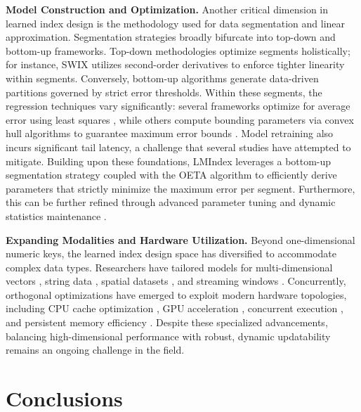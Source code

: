 \textbf{Model Construction and Optimization.}
Another critical dimension in learned index design is the methodology used for data segmentation and linear approximation. Segmentation strategies broadly bifurcate into top-down \cite{case18, alex20, swix24, carmi22} and bottom-up \cite{fiting-tree19, pgm20, bourbon20} frameworks. Top-down methodologies optimize segments holistically; for instance, SWIX \cite{swix24} utilizes second-order derivatives to enforce tighter linearity within segments. Conversely, bottom-up algorithms generate data-driven partitions governed by strict error thresholds. Within these segments, the regression techniques vary significantly: several frameworks optimize for average error using least squares \cite{alex20, sindex20, finedex21, swix24}, while others compute bounding parameters via convex hull algorithms to guarantee maximum error bounds \cite{pgm20, madex20, towards21}. Model retraining also incurs significant tail latency, a challenge that several studies \cite{chameleon24, vega25, hire25} have attempted to mitigate. Building upon these foundations, LMIndex leverages a bottom-up segmentation strategy coupled with the OETA algorithm to efficiently derive parameters that strictly minimize the maximum error per segment. Furthermore, this can be further refined through advanced parameter tuning \cite{tuning22, airindex23, newtuning25} and dynamic statistics maintenance \cite{sali23}.

\textbf{Expanding Modalities and Hardware Utilization.}
Beyond one-dimensional numeric keys, the learned index design space has diversified to accommodate complex data types. Researchers have tailored models for multi-dimensional vectors \cite{flood20, Tsunami20, coax23, learnedaknn22}, string data \cite{sindex20, rss21, lits24}, spatial datasets \cite{ifx20, lisa20, wisk23}, and streaming windows \cite{flirt23}. Concurrently, orthogonal optimizations have emerged to exploit modern hardware topologies, including CPU cache optimization \cite{carmi22}, GPU acceleration \cite{hyper24}, concurrent execution \cite{xindex20, finedex21}, and persistent memory efficiency \cite{apex21, simple23, learnedpmem23, disklearned24, wipe24, making24}. Despite these specialized advancements, balancing high-dimensional performance with robust, dynamic updatability remains an ongoing challenge in the field.



\section{Conclusions}
\label{sec:conclusions}

